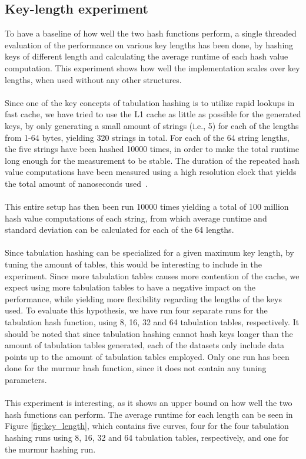 \documentclass[11pt]{report} %
\begin{document}
\subsection{Key-length experiment}
\label{subsec:hash_func_key_len}
To have a baseline of how well the two hash functions perform, a single threaded evaluation of the performance on various key lengths has been done, by hashing keys of different length and calculating the average runtime of each hash value computation. This experiment shows how well the implementation scales over key lengths, when used without any other structures. \\
\\
Since one of the key concepts of tabulation hashing is to utilize rapid lookups in fast cache, we have tried to use the L1 cache as little as possible for the generated keys, by only generating a small amount of strings (i.e., 5) for each of the lengths from 1-64 bytes, yielding 320 strings in total. For each of the 64 string lengths, the five strings have been hashed 10000 times, in order to make the total runtime long enough for the measurement to be stable. The duration of the repeated hash value computations have been measured using a high resolution clock that yields the total amount of nanoseconds used~\cite{chrono}. \\
\\
This entire setup has then been run 10000 times yielding a total of 100 million hash value computations of each string, from which average runtime and standard deviation can be calculated for each of the 64 lengths. \\
\\
Since tabulation hashing can be specialized for a given maximum key length, by tuning the amount of tables, this would be interesting to include in the experiment. Since more tabulation tables causes more contention of the cache, we expect using more tabulation tables to have a negative impact on the performance, while yielding more flexibility regarding the lengths of the keys used. To evaluate this hypothesis, we have run four separate runs for the tabulation hash function, using 8, 16, 32 and 64 tabulation tables, respectively. It should be noted that since tabulation hashing cannot hash keys longer than the amount of tabulation tables generated, each of the datasets only include data points up to the amount of tabulation tables employed. Only one run has been done for the murmur hash function, since it does not contain any tuning parameters. \\
\\
This experiment is interesting, as it shows an upper bound on how well the two hash functions can perform. The average runtime for each length can be seen in Figure \ref{fig:key_length}, which contains five curves, four for the four tabulation hashing runs using 8, 16, 32 and 64 tabulation tables, respectively, and one for the murmur hashing run. 
\end{document}

